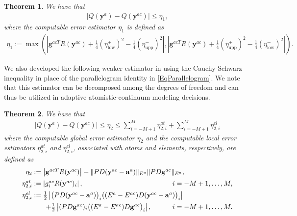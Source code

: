 \documentclass[11pt,reqno,oneside]{amsart}
\newtheorem{theorem}{Theorem}[section]
\numberwithin{equation}{section}
\begin{document}
\begin{theorem} \label{Theorem1}
  We have that
  \begin{align}
    \left| Q({\mathbf{y}}^a) - Q({\mathbf{y}}^{ac}) \right| \le \eta_1,
  \end{align}
  where the computable error estimator $\eta_1$ is defined as
  \begin{align}  \label{EqEta1Def}
    \textstyle \eta_1 :=
    \max\left( \left| {\mathbf{g}}^{acT} R({\mathbf{y}}^{ac}) + \frac{1}{4} (\eta_\text{low}^+)^2
                                             - \frac{1}{4} (\eta_\text{upp}^-)^2 \right|,
      \left| {\mathbf{g}}^{acT} R({\mathbf{y}}^{ac}) + \frac{1}{4} (\eta_\text{upp}^+)^2
                                             - \frac{1}{4} (\eta_\text{low}^-)^2 \right| \right).
  \end{align}

\end{theorem}

We also developed the following weaker estimator in \cite{ArndtLuskin:2007a}
using the Cauchy-Schwarz inequality
in place of the parallelogram identity in \eqref{EqParallelogram}.
We note that this estimator can be decomposed among the degrees of freedom
and can thus be utilized in adaptive atomistic-continuum modeling decisions.
\begin{theorem}
  We have that
  \begin{align}
    \left| Q({\mathbf{y}}^a) - Q({\mathbf{y}}^{ac}) \right| \le \eta_2
    \le \sum_{i=-M+1}^{M} \eta_{2,i}^{at} + \sum_{i=-M+1}^{M} \eta_{2,i}^{el}
  \end{align}
  where the computable global error estimator $\eta_2$ and the computable local
  error estimators $\eta_{2,i}^{at}$ and $\eta_{2,i}^{el}$, associated with atoms and
  elements, respectively, are defined as
  \begin{equation} \label{EqEta2Def}
  \begin{tabular}{r@{}ll}
    $\eta_2$     & \multicolumn{2}{@{}l}{$\; := \left| {\mathbf{g}}^{acT} R({\mathbf{y}}^{ac}) \right|
                 + \|P D ({\mathbf{y}}^{ac} - {\mathbf{a}}^a)\|_{E^a}
                   \|P D {\mathbf{g}}^{ac}\|_{E^a},$} \\[.5em]
    $\eta_{2,i}^{at}$ & $\; := \left| g^{ac}_i R({\mathbf{y}}^{ac})_i \right|,$
                 & $\qquad i=-M+1,\ldots,M,$ \\[.5em]
    $\eta_{2,i}^{el}$ & \multicolumn{2}{@{}l}{$
                 \;:= {{\textstyle \frac{1}{2}}} \left| \big( P D ({\mathbf{y}}^{ac} - {\mathbf{a}}^a) \big)_i
                      \big( (E^a-E^{ac}) D ({\mathbf{y}}^{ac} - {\mathbf{a}}^a) \big)_i
                      \right|$} \\[.5em]
               & $\qquad + {{\textstyle \frac{1}{2}}} \left| (P D {\mathbf{g}}^{ac})_i
                    \big( (E^a-E^{ac}) D {\mathbf{g}}^{ac} \big)_i \right|,$
               & $\qquad i=-M+1,\ldots,M.$
  \end{tabular}
  \end{equation}
\end{theorem}
\end{document}
